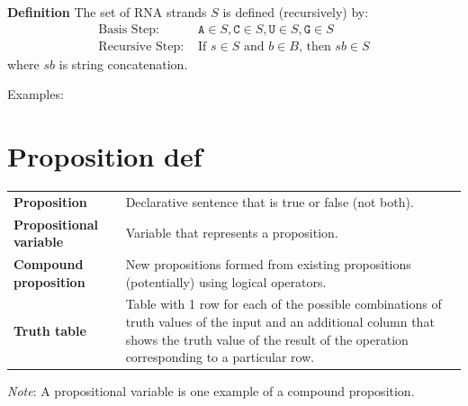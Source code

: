 \documentclass[12pt, oneside]{article}
\newcommand{\A}[0]{\texttt{A}}
\newcommand{\C}[0]{\texttt{C}}
\newcommand{\G}[0]{\texttt{G}}
\newcommand{\U}[0]{\texttt{U}}
\begin{document}
{\bf Definition} The set of RNA strands $S$ is defined (recursively) by:
\[
\begin{array}{ll}
\textrm{Basis Step: } & \A \in S, \C \in S, \U \in S, \G \in S \\
\textrm{Recursive Step: } & \textrm{If } s \in S\textrm{ and }b \in B \textrm{, then }sb \in S
\end{array}
\]
where $sb$ is string concatenation.

Examples: 

\vfill

 \vfill
\section*{Proposition def}


\begin{tabular}{lp{5in}}
    {\bf Proposition} & Declarative sentence that is true or false (not both).\\
    {\bf Propositional variable} & Variable that represents a proposition.\\
    {\bf Compound proposition}& New propositions formed from existing propositions (potentially) using logical operators.\\
    {\bf Truth table}& Table with 1 row for each of the possible combinations of truth values of the input and 
    an additional column that shows the truth value of the result of the operation corresponding to a particular row.
    \end{tabular}
    
    {\it Note}: A propositional variable is one example of a compound proposition. \vfill
\end{document}
